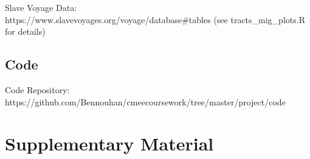 \documentclass[11pt]{article}
\begin{document}
\noindent
Slave Voyage Data: \\
https://www.slavevoyages.org/voyage/database\#tables (see tracts\_mig\_plots.R for details)


\subsection{Code}

Code Repository: \\
https://github.com/Bennouhan/cmeecoursework/tree/master/project/code




\newpage
\printbibliography[heading=bibintoc]














\newpage
\section*{Supplementary Material} %
\renewcommand{\thefigure}{S\arabic{figure}}
\setcounter{figure}{0} 

\end{document}
